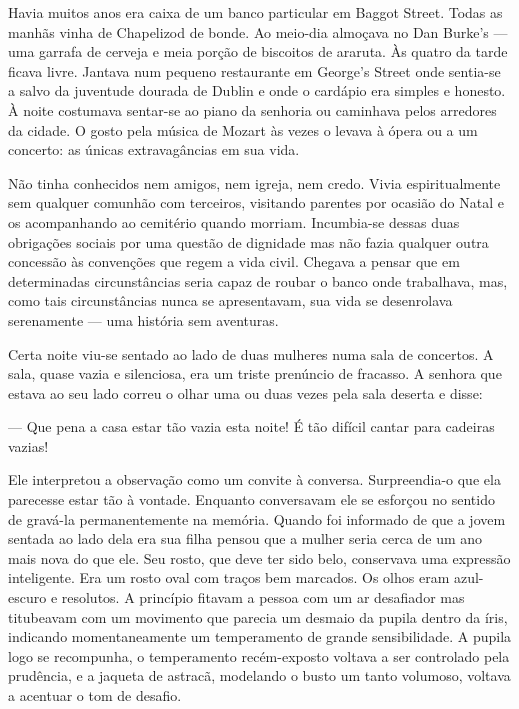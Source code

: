 Havia muitos anos era caixa de um banco particular em Baggot Street.  Todas as
manhãs vinha de Chapelizod de bonde.  Ao meio-dia almoçava no Dan Burke’s
--- uma garrafa de cerveja e meia porção de biscoitos de araruta.  Às quatro
da tarde ficava livre.  Jantava num pequeno restaurante em George’s Street onde
sentia-se a salvo da juventude dourada de Dublin e onde o cardápio era simples
e honesto.  À noite costumava sentar-se ao piano da senhoria ou caminhava pelos
arredores da cidade.  O gosto pela música de Mozart às vezes o levava à ópera
ou a um concerto: as únicas extravagâncias em sua vida.

Não tinha conhecidos nem amigos, nem igreja, nem credo.  Vivia espiritualmente
sem qualquer comunhão com terceiros, visitando parentes por ocasião do Natal e
os acompanhando ao cemitério quando morriam.  Incumbia-se dessas duas
obrigações sociais por uma questão de dignidade mas não fazia qualquer outra
concessão às convenções que regem a vida civil.  Chegava a pensar que em
determinadas circunstâncias seria capaz de roubar o banco onde trabalhava, mas,
como tais circunstâncias nunca se apresentavam, sua vida se desenrolava
serenamente --- uma história sem aventuras.

Certa noite viu-se sentado ao lado de duas mulheres numa sala de concertos.  A
sala, quase vazia e silenciosa, era um triste prenúncio de fracasso.  A senhora
que estava ao seu lado correu o olhar uma ou duas vezes pela sala deserta e
disse:

--- Que pena a casa estar tão vazia esta noite!  É tão difícil cantar para
cadeiras vazias!

Ele interpretou a observação como um convite à conversa.  Surpreendia-o que ela
parecesse estar tão à vontade.  Enquanto conversavam ele se esforçou no sentido
de gravá-la permanentemente na memória.  Quando foi informado de que a jovem
sentada ao lado dela era sua filha pensou que a mulher seria cerca de um ano
mais nova do que ele.  Seu rosto, que deve ter sido belo, conservava uma
expressão inteligente.  Era um rosto oval com traços bem marcados.  Os olhos
eram azul-escuro e resolutos.  A princípio fitavam a pessoa com um ar
desafiador mas titubeavam com um movimento que parecia um desmaio da pupila
dentro da íris, indicando momentaneamente um temperamento de grande
sensibilidade.  A pupila logo se recompunha, o temperamento recém-exposto
voltava a ser controlado pela prudência, e a jaqueta de astracã, modelando o
busto um tanto volumoso, voltava a acentuar o tom de desafio.

